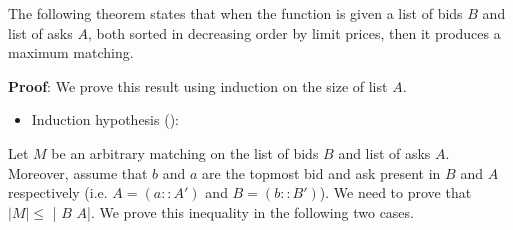 \documentclass[a4paper,UKenglish,cleveref, autoref]{lipics-v2019}
\begin{document}
The following theorem states that when the function  is given a list of bids $B$ and list of asks $A$, both sorted in decreasing order by limit prices, then it produces a maximum matching.
\begin{theorem}
\end{theorem}
\textbf{Proof}: We prove this result using induction on the size of list $A$. 
\begin{itemize}
\item Induction hypothesis (): \emph{  }
\end{itemize}
Let $M$ be an arbitrary matching on the list of bids $B$ and list of asks $A$. Moreover, assume that $b$ and $a$ are the topmost bid and ask present in $B$ and $A$ respectively (i.e. $A = (a::A')$ and $B = (b::B')$). We need to prove that $|M| \leq$ | $B$ $A$|.  We prove this inequality in  the following two cases.
\end{document}
